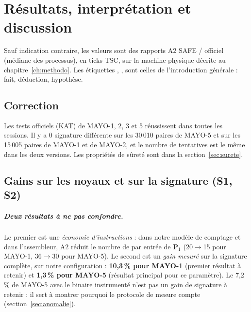 \chapter[Résultats et discussion]{Résultats, interprétation et discussion}
\label{ch:resultats}

Sauf indication contraire, les valeurs sont des rapports A2 SAFE / officiel (médiane des processus), en ticks TSC, sur la machine physique décrite au chapitre~\ref{ch:methodo}. Les étiquettes \F{}, \I{}, \Hy{} sont celles de l'introduction générale : \F{} fait, \I{} déduction, \Hy{} hypothèse.

\section{Correction}
\F{} Les tests officiels (KAT) de MAYO-1, 2, 3 et 5 réussissent dans toutes les sessions. Il y a 0 signature différente sur les 30\,010 paires de MAYO-5 et sur les 15\,005 paires de MAYO-1 et de MAYO-2, et le nombre de tentatives est le même dans les deux versions. Les propriétés de sûreté sont dans la section~\ref{sec:surete}.

\section{Gains sur les noyaux et sur la signature (S1, S2)}
\paragraph{Deux résultats à ne pas confondre.} Le premier est une \emph{économie d'instructions} : dans notre modèle de comptage et dans l'assembleur, A2 réduit le nombre de  par entrée de $\mathbf{P}_1$ (20$\to$15 pour MAYO-1, 36$\to$30 pour MAYO-5). Le second est un \emph{gain mesuré} sur la signature complète, sur notre configuration : \textbf{10,3\,\% pour MAYO-1} (premier résultat à retenir) et \textbf{1,3\,\% pour MAYO-5} (résultat principal pour ce paramètre). Le 7,2\,\% de MAYO-5 avec le binaire instrumenté n'est pas un gain de signature à retenir : il sert à montrer pourquoi le protocole de mesure compte (section~\ref{sec:anomalie}).

